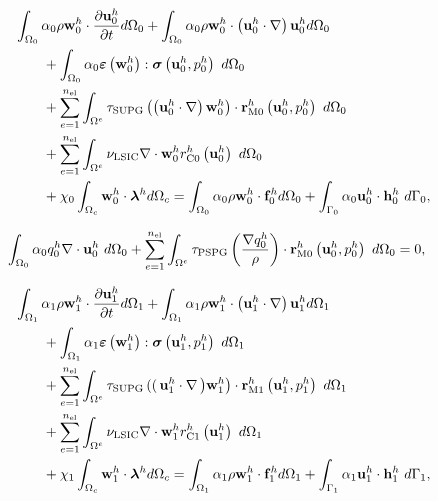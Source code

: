 \documentclass[tese_patricia]{subfiles}
\begin{document}
\begin{align}
	\begin{split}
		&\int_{\domain_0} \arlequinWFGlobal \density \wglobalh \cdot \frac{\partial\uglobalh}{\partial t} d\domain_{0} +
		\int_{\domain_0} \arlequinWFGlobal \density \wglobalh \cdot  \left(\uglobalh \cdot \nabla\right)\uglobalh d\domain_{0}  \\ 
		&\qquad+	
		\int_{\domain_{0}} \arlequinWFGlobal \straintensor \left(\wglobalh\right) : \stresstensor \left(\uglobalh,\pglobalh\right)\ d\domain_{0} 
		\\ 
		&\qquad+ \sum_{e=1}^{\nel} \int_{\domainE} \SUPG  \left(\left(\uglobalh \cdot \nabla \right) \wglobalh\right) \cdot \resMomGlobal\left(\uglobalh,\pglobalh \right)\  d\domain_{0} \\ 
		&\qquad+\sum_{e=1}^{\nel} \int_{\domainE} \LSIC \nabla \cdot \wglobalh \resPreGlobal 
		\left(\uglobalh\right)\  d\domain_{0} \\
		&\qquad+ \chi_{0} \int_{\domain_c} \wglobalh \cdot \lagrangeMultiplier^{h} d\domain_{c}  = \int_{\domain_0} \arlequinWFGlobal \density \wglobalh \cdot  \sbodyforce_{0}^{h} d\domain_{0} + \int_{\boundary_{0}} \arlequinWFGlobal \uglobalh \cdot \straction_{0}^{h}\ d\boundary_{0}, 
		\label{eq:FinalSystem0est}
	\end{split}
\end{align}


\begin{align}
	\begin{split}
		&	\int_{\Omega_{0}} \alpha_0 q_0^h \nabla \cdot \mathbf{u}_0^h \ d\Omega_{0} +
		\sum_{e=1}^{n_{\mathrm{el}}} \int_{\Omega^e} \tau_{\mathrm{PSPG}} \left(\frac{\nabla q_0^h}{\rho}\right) \cdot \mathbf{r}_{\mathrm{M0}}^{h}\left(\mathbf{u}_0^h,p_0^h\right) \  d\Omega_{0} = 0, 
		\label{eq:RC0est}
	\end{split}
\end{align}


\begin{align}
	\begin{split}
		&\int_{\domain_1} \arlequinWFLocal \density \wlocalh \cdot \frac{\partial\ulocalh}{\partial t} d\domain_{1} +
		\int_{\domain_1} \arlequinWFLocal \density \wlocalh \cdot  \left(\ulocalh \cdot \nabla\right)\ulocalh d\domain_{1}  \\ 
		&\qquad+	
		\int_{\domain_{1}} \arlequinWFLocal \straintensor \left(\wlocalh\right) : \stresstensor \left(\ulocalh,\plocalh\right)\ d\domain_{1} 
		\\ 
		&\qquad+ \sum_{e=1}^{\nel} \int_{\domainE} \SUPG  \left( \right(\ulocalh \cdot \nabla \left) \wlocalh\right) \cdot \resMomLocal\left(\ulocalh,\plocalh \right)\  d\domain_{1} \\ 
		&\qquad+\sum_{e=1}^{\nel} \int_{\domainE} \LSIC \nabla \cdot \wlocalh \resPreLocal
		\left(\ulocalh\right)\  d\domain_{1} \\
		&\qquad+ \chi_{1} \int_{\domain_c} \wlocalh \cdot \lagrangeMultiplier^{h} d\domain_{c}  = \int_{\domain_1} \arlequinWFLocal \density \wlocalh \cdot  \sbodyforce_{1}^{h} d\domain_{1} + \int_{\boundary_{1}} \arlequinWFLocal \ulocalh \cdot \straction_{1}^{h}\ d\boundary_{1}, 
		\label{eq:FinalSystem1est}
	\end{split}
\end{align}
\end{document}
